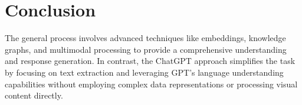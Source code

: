 \documentclass[12pt]{article}
\begin{document}
\section{Conclusion}

The general process involves advanced techniques like embeddings, knowledge graphs, and multimodal processing to provide a comprehensive understanding and response generation. In contrast, the ChatGPT approach simplifies the task by focusing on text extraction and leveraging GPT's language understanding capabilities without employing complex data representations or processing visual content directly.
\end{document}
